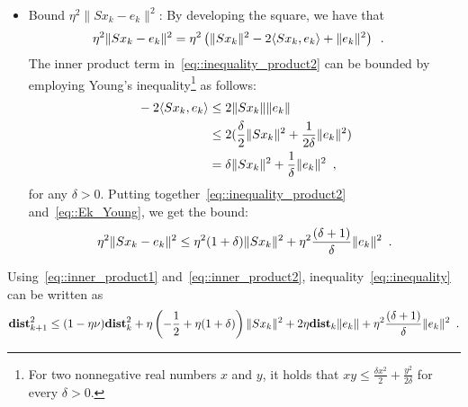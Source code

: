 \documentclass[envcountsect]{svjour3}
\newcommand{\dist}{{\mathbf{dist} }}
\begin{document}
\begin{itemize}
\item Bound $\eta^2\|Sx_k-e_k\|^2$: By developing the square, we have that
\begin{align}{\label{eq::inequality_product2}}
\eta^2\|Sx_k-e_k\|^2 &= \eta^2 \left(\|Sx_k\|^2 -2\langle Sx_k,e_k\rangle + \|e_k\|^2\right)\enspace.
\end{align}
The inner product term in~\eqref{eq::inequality_product2} can be bounded by employing Young's inequality\footnote{For two nonnegative real numbers $x$ and $y$, it holds that $xy\leq \frac{\delta x^2}{2}+\frac{y^2}{2\delta}$ for every $\delta>0$.} as follows:
\begin{align}{\label{eq::Ek_Young}}
-2\langle Sx_k,e_k\rangle \nonumber&\leq 2\|Sx_k\|\|e_k\| \\\nonumber
     &\leq 2(\frac{\delta}{2}\|Sx_k\|^2+\frac{1}{2\delta}\|e_k\|^2)\\
     &= \delta\|Sx_k\|^2 + \frac{1}{\delta}\|e_k\|^2\enspace,
\end{align}
for any $\delta>0$. Putting together~\eqref{eq::inequality_product2} and~\eqref{eq::Ek_Young}, we get the bound:
\begin{equation}{\label{eq::inner_product2}}
\eta^2\|Sx_k-e_k\|^2 \leq \eta^2(1+\delta)\|Sx_k\|^2 +
\eta^2\frac{(\delta+1)}{\delta}\|e_k\|^2\enspace.
\end{equation}
\end{itemize}

Using~\eqref{eq::inner_product1} and~\eqref{eq::inner_product2}, inequality~\eqref{eq::inequality} can be written as
\begin{equation}{\label{eq::inequality4}}
 \dist_{k+1}^2 \leq (1-\eta\nu)\dist_k^2
                            +\eta\left(-\frac{1}{2}+\eta(1+\delta)\right)\|Sx_k\|^2
                            +2\eta\dist_k\|e_k\|
                            +\eta^2\frac{(\delta+1)}{\delta}\|e_k\|^2
                                   \enspace.
\end{equation}
\end{document}
